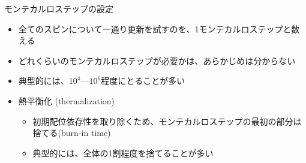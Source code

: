 
\begin{frame}[t,fragile]{モンテカルロステップの設定}
  \begin{itemize}
  \item 全てのスピンについて一通り更新を試すのを、1モンテカルロステップと数える
  \item どれくらいのモンテカルロステップが必要かは、あらかじめは分からない
  \item 典型的には、$10^4$---$10^6$程度にとることが多い
  \item 熱平衡化 (thermalization)
    \begin{itemize}
    \item 初期配位依存性を取り除くため、モンテカルロステップの最初の部分は捨てる(burn-in time)
    \item 典型的には、全体の1割程度を捨てることが多い
    \end{itemize}
  \end{itemize}
\end{frame}
